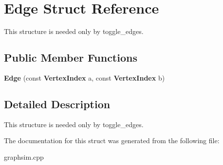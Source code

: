 \section{Edge Struct Reference}
\label{structEdge}
This structure is needed only by toggle\_\-edges.  


\subsection*{Public Member Functions}
\begin{CompactItemize}
\item 
{\bf Edge} (const  {\bf Vertex\-Index} a, const  {\bf Vertex\-Index} b)\label{structEdge_a0}

\end{CompactItemize}


\subsection{Detailed Description}
This structure is needed only by toggle\_\-edges. 



The documentation for this struct was generated from the following file:\begin{CompactItemize}
\item 
graphsim.cpp\end{CompactItemize}
